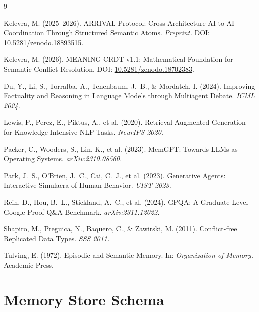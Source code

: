 \documentclass[11pt,a4paper]{article}
\begin{document}
\begin{thebibliography}{9}

Kelevra, M. (2025--2026).
\newblock ARRIVAL Protocol: Cross-Architecture AI-to-AI Coordination
  Through Structured Semantic Atoms.
\newblock \textit{Preprint.}
\newblock DOI: \href{https://doi.org/10.5281/zenodo.18893515}%
  {10.5281/zenodo.18893515}.

Kelevra, M. (2026).
\newblock MEANING-CRDT v1.1: Mathematical Foundation for Semantic
  Conflict Resolution.
\newblock DOI: \href{https://doi.org/10.5281/zenodo.18702383}%
  {10.5281/zenodo.18702383}.

Du, Y., Li, S., Torralba, A., Tenenbaum, J.~B., \& Mordatch, I. (2024).
\newblock Improving Factuality and Reasoning in Language Models through
  Multiagent Debate.
\newblock \textit{ICML 2024.}

Lewis, P., Perez, E., Piktus, A., et al. (2020).
\newblock Retrieval-Augmented Generation for Knowledge-Intensive NLP
  Tasks.
\newblock \textit{NeurIPS 2020.}

Packer, C., Wooders, S., Lin, K., et al. (2023).
\newblock MemGPT: Towards LLMs as Operating Systems.
\newblock \textit{arXiv:2310.08560.}

Park, J.~S., O'Brien, J.~C., Cai, C.~J., et al. (2023).
\newblock Generative Agents: Interactive Simulacra of Human Behavior.
\newblock \textit{UIST 2023.}

Rein, D., Hou, B.~L., Stickland, A.~C., et al. (2024).
\newblock GPQA: A Graduate-Level Google-Proof Q\&A Benchmark.
\newblock \textit{arXiv:2311.12022.}

Shapiro, M., Preguica, N., Baquero, C., \& Zawirski, M. (2011).
\newblock Conflict-free Replicated Data Types.
\newblock \textit{SSS 2011.}

Tulving, E. (1972).
\newblock Episodic and Semantic Memory.
\newblock In: \textit{Organization of Memory.} Academic Press.

\end{thebibliography}

\appendix
\section{Memory Store Schema}
\end{document}
